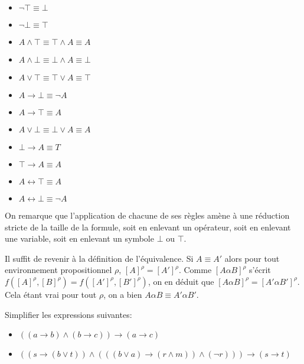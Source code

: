 \documentclass{scrartcl}
\begin{document}
			\begin{multicols}{3}
			\begin{itemize}
				\item $\neg \top \equiv \bot$ 
				\item $\neg \bot \equiv \top$ 
				\item $A \wedge \top \equiv \top \wedge A \equiv A$ 
				\item $A \wedge \bot \equiv \bot \wedge A \equiv \bot$ 
				\item $A \vee \top \equiv \top \vee A \equiv \top$ 
				\item $A \rightarrow \bot \equiv \neg A$ 
				\item $A \rightarrow \top \equiv A$ 
				\item $A \vee \bot \equiv \bot \vee A \equiv A$ 
				\item $\bot \rightarrow A \equiv T$ 
				\item $\top \rightarrow A \equiv A$ 
				\item $A \leftrightarrow \top \equiv A$ 
				\item $A \leftrightarrow \bot \equiv \neg A$ 
			\end{itemize}
			\end{multicols}		

			On remarque que l'application de chacune de ses règles amène à une réduction stricte de la taille de la formule, 
			soit en enlevant un opérateur, soit en enlevant une variable, soit en enlevant un symbole $\bot$ ou $\top$.

			\begin{demo}
				\item Il suffit de revenir à la définition de l'équivalence. 
				Si $A \equiv A'$ alors pour tout environnement propositionnel $\rho$, $[A]^\rho = [A']^\rho$. 
				Comme $[A \alpha B]^\rho$ s'écrit $f([A]^\rho,[B]^\rho) = f([A']^\rho,[B']^\rho)$, on en déduit que 
				$[A \alpha B]^\rho = [A' \alpha B']^\rho$. Cela étant vrai pour tout $\rho$, on a bien $A\alpha B \equiv A' \alpha B'$.
			\end{demo}

			\exo Simplifier les expressions suivantes: 
			\begin{itemize}
				\item $((a \rightarrow b) \wedge (b \rightarrow c)) \rightarrow (a \rightarrow c)$
				\item $((s \rightarrow (b \vee t)) \wedge (((b \vee a) \rightarrow (r \wedge m)) \wedge (\neg r))) \rightarrow (s \rightarrow t)$
			\end{itemize}
\end{document}
